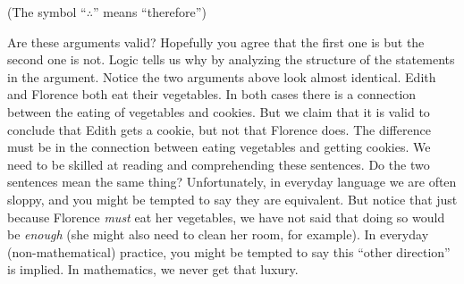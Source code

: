 \documentclass[10pt,]{book}
\theoremstyle{plain}
\theoremstyle{definition}
\theoremstyle{definition}
\theoremstyle{definition}
\theoremstyle{definition}
\numberwithin{equation}{chapter}
\begin{document}
\par
\hypertarget{p-986}{}%
(The symbol ``\(\therefore\)''\label{notation-28}
 means ``therefore'')%
\par
\hypertarget{p-987}{}%
Are these arguments valid? Hopefully you agree that the first one is but the second one is not. Logic tells us why by analyzing the structure of the statements in the argument. Notice the two arguments above look almost identical. Edith and Florence both eat their vegetables. In both cases there is a connection between the eating of vegetables and cookies. But we claim that it is valid to conclude that Edith gets a cookie, but not that Florence does. The difference must be in the connection between eating vegetables and getting cookies. We need to be skilled at reading and comprehending these sentences. Do the two sentences mean the same thing? Unfortunately, in everyday language we are often sloppy, and you might be tempted to say they are equivalent. But notice that just because Florence \emph{must} eat her vegetables, we have not said that doing so would be \emph{enough} (she might also need to clean her room, for example). In everyday (non-mathematical) practice, you might be tempted to say this ``other direction'' is implied. In mathematics, we never get that luxury.%
\typeout{************************************************}
\typeout{************************************************}
\end{document}
